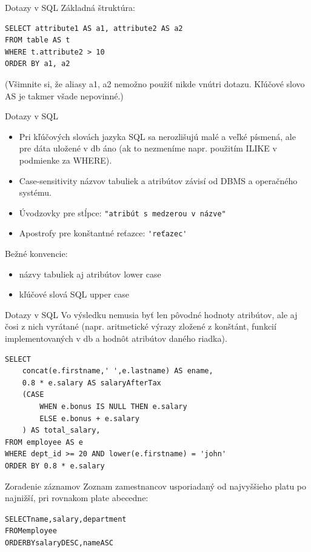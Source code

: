 \documentclass[12pt]{beamer}
\begin{document}
\begin{frame}[fragile]{Dotazy v SQL}
Základná štruktúra:
\begin{verbatim}
SELECT attribute1 AS a1, attribute2 AS a2
FROM table AS t
WHERE t.attribute2 > 10
ORDER BY a1, a2
\end{verbatim}
(Všimnite si, že aliasy a1, a2 nemožno použiť nikde vnútri dotazu. Kľúčové slovo AS je takmer všade nepovinné.)
\end{frame}

\begin{frame}[fragile]{Dotazy v SQL}
\begin{itemize}
\item Pri kľúčových slovách jazyka SQL sa nerozlišujú malé a veľké písmená,
ale pre dáta uložené v db áno (ak to nezmeníme napr. použitím ILIKE v podmienke za WHERE).
\item Case-sensitivity názvov tabuliek a atribútov závisí od DBMS a operačného systému.
\item Úvodzovky pre stĺpce: \verb|"atribút s medzerou v názve"|
\item Apostrofy pre konštantné reťazce: \verb|'reťazec'|
\end{itemize}

Bežné konvencie:
\begin{itemize}
\item názvy tabuliek aj atribútov lower case
\item kľúčové slová SQL upper case
\end{itemize}
\end{frame}

\begin{frame}[fragile]{Dotazy v SQL}
Vo výsledku nemusia byť len pôvodné hodnoty atribútov, ale aj čosi z nich vyrátané (napr. aritmetické výrazy zložené z konštánt, funkcií implementovaných v db a hodnôt atribútov daného riadka).\\[3mm]

\begin{verbatim}
SELECT
    concat(e.firstname,' ',e.lastname) AS ename,
    0.8 * e.salary AS salaryAfterTax
    (CASE
        WHEN e.bonus IS NULL THEN e.salary
        ELSE e.bonus + e.salary
    ) AS total_salary,
FROM employee AS e
WHERE dept_id >= 20 AND lower(e.firstname) = 'john'
ORDER BY 0.8 * e.salary
\end{verbatim}
\end{frame}

\begin{frame}[fragile]{Zoradenie záznamov}
Zoznam zamestnancov usporiadaný od najvyššieho platu po najnižší, pri rovnakom plate abecedne:
\begin{alltt}
SELECT name, salary, department
FROM employee
\alert{ORDER BY} salary DESC, name ASC
\end{alltt}
\end{frame}
\end{document}

